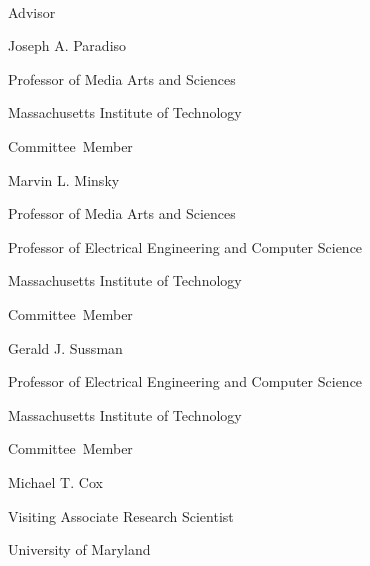 \thispagestyle{empty}
\begin{center}
    \spacedlowsmallcaps{\myName} \\ \medskip                        

    \begingroup
        \color{Maroon}\spacedallcaps{\myTitle}
    \endgroup
\end{center}        

\begin{flushright}
           Advisor\hspace{0.5cm}~\makebox[2.75in]{\hrulefill}

                                 Joseph A. Paradiso

                                 Professor of Media Arts and Sciences
                                 
                                 Massachusetts Institute of Technology
                                 
  \vspace{5mm}
  
  Committee~Member\hspace{0.5cm}~\makebox[2.75in]{\hrulefill}
  
                                 Marvin L. Minsky

                                 Professor of Media Arts and Sciences

                                 Professor of Electrical Engineering and Computer Science
                                 
                                 Massachusetts Institute of Technology
                                 
  Committee~Member\hspace{0.5cm}~\makebox[2.75in]{\hrulefill}
  
                                 Gerald J. Sussman

                                 Professor of Electrical Engineering and Computer Science
                                 
                                 Massachusetts Institute of Technology

  Committee~Member\hspace{0.5cm}~\makebox[2.75in]{\hrulefill}

                                 Michael T. Cox

                                 Visiting Associate Research Scientist
                                 
                                 University of Maryland

\end{flushright}


